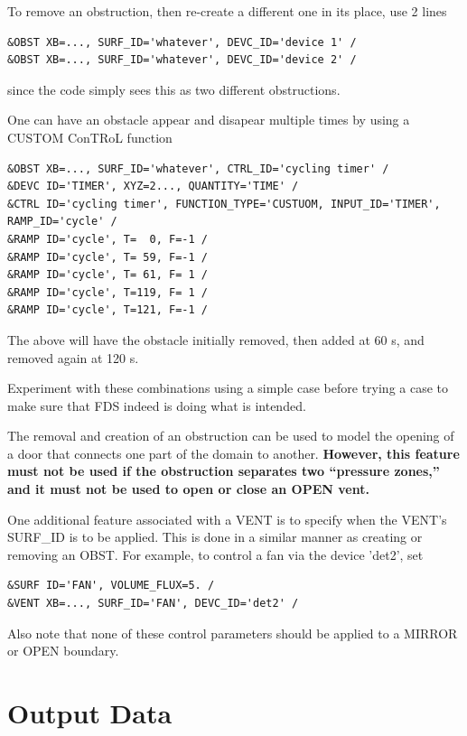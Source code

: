 \documentclass[11pt]{book}
\begin{document}
To remove an obstruction, then re-create a different one in its place, use 2 lines


\footnotesize
\begin{verbatim}
&OBST XB=..., SURF_ID='whatever', DEVC_ID='device 1' /
&OBST XB=..., SURF_ID='whatever', DEVC_ID='device 2' /
\end{verbatim}

\normalsize
\noindent
since the code simply sees this as two different obstructions.

One can have an obstacle appear and disapear multiple times by using a {\ct CUSTOM ConTRoL} function

\footnotesize
\begin{verbatim}
&OBST XB=..., SURF_ID='whatever', CTRL_ID='cycling timer' /
&DEVC ID='TIMER', XYZ=2..., QUANTITY='TIME' /
&CTRL ID='cycling timer', FUNCTION_TYPE='CUSTUOM, INPUT_ID='TIMER', RAMP_ID='cycle' /
&RAMP ID='cycle', T=  0, F=-1 /
&RAMP ID='cycle', T= 59, F=-1 /
&RAMP ID='cycle', T= 61, F= 1 /
&RAMP ID='cycle', T=119, F= 1 /
&RAMP ID='cycle', T=121, F=-1 /
\end{verbatim}

\normalsize
\noindent
The above will have the obstacle initially removed, then added at 60 s, and removed again at 120 s.

Experiment with these combinations using a simple
case before trying a case to make sure that FDS indeed is doing what is intended.

The removal and creation of an obstruction
can be used to model the opening of a door that connects one
part of the domain to another. {\bf However, this feature must not be used if the obstruction separates
two ``pressure zones,'' and it must not be used to open or close an {\ct OPEN} vent.}

One additional feature associated with a {\ct VENT} is to specify when the {\ct VENT}'s
{\ct SURF\_ID} is to be applied.  This is done in a similar manner as creating or removing an {\ct OBST}.
For example, to control a fan via the device {\ct 'det2'}, set

\footnotesize
\begin{verbatim}
&SURF ID='FAN', VOLUME_FLUX=5. /
&VENT XB=..., SURF_ID='FAN', DEVC_ID='det2' /
\end{verbatim}
\normalsize
\noindent
Also note that none of these
control parameters should be applied to a {\ct MIRROR} or {\ct OPEN} boundary.


\clearpage

\section{Output Data} %
\label{info:outputdata}
\end{document}
